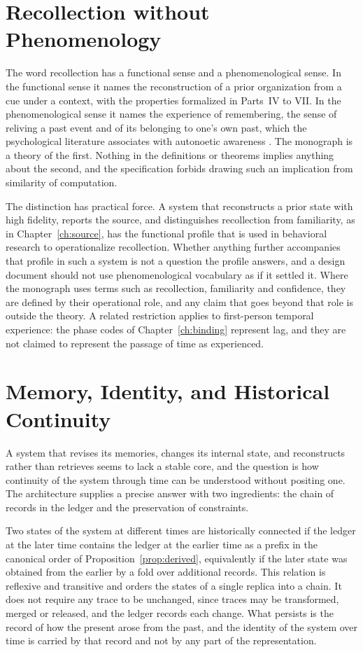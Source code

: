 \chapter{Recollection without Phenomenology}\label{ch:phenom}

The word recollection has a functional sense and a phenomenological sense. In the functional sense it names the reconstruction of a prior organization from a cue under a context, with the properties formalized in Parts~IV to VII. In the phenomenological sense it names the experience of remembering, the sense of reliving a past event and of its belonging to one's own past, which the psychological literature associates with autonoetic awareness \cite{tulving1983}. The monograph is a theory of the first. Nothing in the definitions or theorems implies anything about the second, and the specification forbids drawing such an implication from similarity of computation.

The distinction has practical force. A system that reconstructs a prior state with high fidelity, reports the source, and distinguishes recollection from familiarity, as in Chapter~\ref{ch:source}, has the functional profile that is used in behavioral research to operationalize recollection. Whether anything further accompanies that profile in such a system is not a question the profile answers, and a design document should not use phenomenological vocabulary as if it settled it. Where the monograph uses terms such as recollection, familiarity and confidence, they are defined by their operational role, and any claim that goes beyond that role is outside the theory. A related restriction applies to first-person temporal experience: the phase codes of Chapter~\ref{ch:binding} represent lag, and they are not claimed to represent the passage of time as experienced.

\chapter{Memory, Identity, and Historical Continuity}\label{ch:identity}

A system that revises its memories, changes its internal state, and reconstructs rather than retrieves seems to lack a stable core, and the question is how continuity of the system through time can be understood without positing one. The architecture supplies a precise answer with two ingredients: the chain of records in the ledger and the preservation of constraints.

Two states of the system at different times are historically connected if the ledger at the later time contains the ledger at the earlier time as a prefix in the canonical order of Proposition~\ref{prop:derived}, equivalently if the later state was obtained from the earlier by a fold over additional records. This relation is reflexive and transitive and orders the states of a single replica into a chain. It does not require any trace to be unchanged, since traces may be transformed, merged or released, and the ledger records each change. What persists is the record of how the present arose from the past, and the identity of the system over time is carried by that record and not by any part of the representation.

